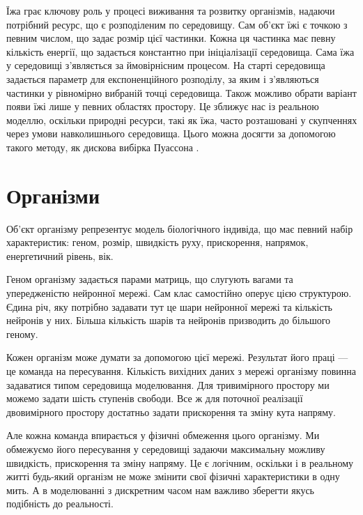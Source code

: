 Їжа грає ключову роль у процесі виживання та розвитку організмів, 
надаючи потрібний ресурс, що є розподіленим по середовищу. 
Сам об’єкт їжі є точкою з певним числом, 
що задає розмір цієї частинки. 
Кожна ця частинка має певну кількість енергії, 
що задається константно при ініціалізації середовища. 
Сама їжа у середовищі з’являється за ймовірнісним процесом. 
На старті середовища задається параметр для експоненційного розподілу, 
за яким і з’являються частинки у рівномірно вибраній точці середовища.
Також можливо обрати варіант появи їжі лише у певних
областях простору. Це зближує нас із реальною моделлю, оскільки 
природні ресурси, такі як їжа, часто розташовані у скупченнях 
через умови навколишнього середовища. 
Цього можна досягти за допомогою такого методу, як дискова вибірка Пуассона
\cite{bridsonFastPoissonDisk2007}.



\section{Організми}

Об’єкт організму репрезентує модель біологічного індивіда, 
що має певний набір характеристик: геном, розмір, швидкість руху, 
прискорення, напрямок, енергетичний рівень, вік.

Геном організму задається парами матриць, 
що слугують вагами та упередженістю нейронної мережі. 
Сам клас самостійно оперує цією структурою. 
Єдина річ, яку потрібно задавати тут це шари нейронної 
мережі та кількість нейронів у них. 
Більша кількість шарів та нейронів призводить до більшого геному.

Кожен організм може думати за допомогою цієї мережі. 
Результат його праці --- це команда на пересування.
Кількість вихідних даних з мережі організму повинна
задаватися типом середовища моделювання.
Для тривимірного простору ми можемо задати шість ступенів свободи.
Все ж для поточної реалізації двовимірного простору
достатньо задати прискорення та зміну кута напряму.

Але кожна команда впирається у фізичні обмеження цього організму. 
Ми обмежуємо його пересування у середовищі задаючи максимальну 
можливу швидкість, прискорення та зміну напряму. 
Це є логічним, оскільки і в реальному житті будь-який 
організм не може змінити свої фізичні характеристики в одну мить. 
А в моделюванні з дискретним часом нам важливо зберегти якусь подібність до реальності.

